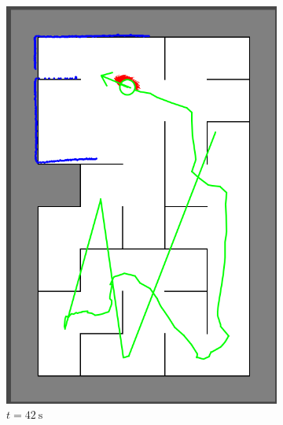 \begin{figure}[H]
\begin{subfigure}{0.2\textwidth}
         \includegraphics[width=\textwidth]{figures/localization_42s.png}
         \caption{$t = \SI{42}{\second}$}
         \label{mapping20s}
     \end{subfigure}\\
     \begin{subfigure}{0.2\textwidth}
         \centering

\end{subfigure}
\end{figure}
